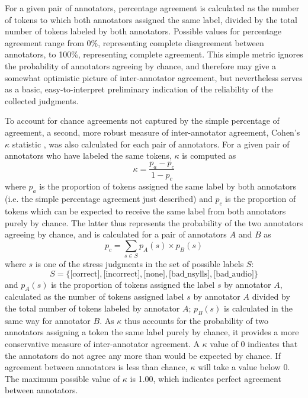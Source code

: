 		For a given pair of annotators, percentage agreement is calculated as the number of tokens to which both annotators assigned the same label, divided by the total number of tokens labeled by both annotators. Possible values for percentage agreement range from 0\%, representing complete disagreement between annotators, to 100\%, representing complete agreement. This simple metric ignores the probability of annotators agreeing by chance, and therefore may give a somewhat optimistic picture of inter-annotator agreement, but nevertheless serves as a basic, easy-to-interpret preliminary indication of the reliability of the collected judgments.
		
		To account for chance agreements not captured by the simple percentage of agreement, a second, more robust measure of inter-annotator agreement, Cohen's $\kappa$ statistic \citep{Cohen1960}, was also calculated for each pair of annotators. For a given pair of annotators who have labeled the same tokens, $\kappa$ is computed as
		\[
		\kappa = \frac{p_a-p_c}{1-p_c}
		\]
		where $p_a$ is the proportion of tokens assigned the same label by both annotators (i.e. the simple percentage agreement just described) and $p_c$ is the proportion of tokens which can be expected to receive the same label from both annotators purely by chance. The latter thus represents the probability of the two annotators agreeing by chance, and is calculated for a pair of annotators $A$ and $B$ as
		\[
		p_c = \sum_{s \in S} p_A(s) \times p_B(s)
		\]
		where $s$ is one of the stress judgments in the set of possible labels $S$:
		\[S = \{\text{[correct]}, \text{[incorrect]}, \text{[none]}, \text{[bad\_nsylls]}, \text{[bad\_audio]}\}\]
		and $p_A(s)$ is the proportion of tokens assigned the label $s$ by annotator $A$, calculated as the number of tokens assigned label $s$ by annotator $A$ divided by the total number of tokens labeled by annotator $A$; $p_B(s)$ is calculated in the same way for annotator $B$.
		As $\kappa$ thus accounts for the probability of two annotators assigning a token the same label purely by chance, it provides a more conservative measure of inter-annotator agreement. A $\kappa$ value of 0 indicates that the annotators do not agree any more than would be expected by chance. If agreement between annotators is less than chance, $\kappa$ will take a value below 0. The maximum possible value of $\kappa$ is 1.00, which indicates perfect agreement between annotators.
		
